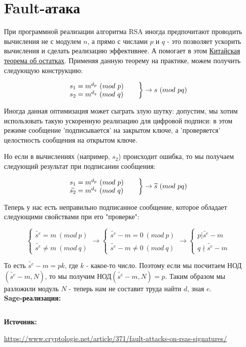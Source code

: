 \documentclass[12pt,a4paper]{scrartcl}
\begin{document}
\section{Fault-атака}

При программной реализации алгоритма RSA иногда предпочитают проводить вычисления не с модулем $n$, а прямо с числами $p$ и  $q$  - это позволяет ускорить вычисления и сделать реализацию эффективнее. А помогает в этом \href{https://yatb.kksctf.ru/}{Китайская теорема об остатках}. Применяя данную теорему на практике, можем получить следующую конструкцию:

$$\left.\parbox{3.5cm}{$s_{1} = m^{d_p}\ (mod\ p) \\ s_{2} = m^{d_q}\ (mod\ q)$}  \right\} \rightarrow s\ (mod\ pq)$$

Иногда данная оптимизация может сыграть злую шутку: допустим, мы хотим использовать такую ускоренную реализацию для цифровой подписи: в этом режиме сообщение 'подписывается' на закрытом ключе, а 'проверяется' целостность сообщения на открытом ключе.

Но если в вычислениях (например, $s_{2}$) происходит ошибка, то мы получаем следующий результат при подписании сообщения:

$$\left.\parbox{3.5cm}{$s_{1} = m^{d_p}\ (mod\ p) \\ \widetilde{s_{2}} = m^{d_q}\ (mod\ q)$}  \right\} \rightarrow \widetilde{s}\ (mod\ pq)$$

Теперь у нас есть неправильно подписанное сообщение, которое обладает следующими свойствами при его "проверке":

$$\begin{cases} \widetilde{s^e} = m\ (mod\ p)\\ \widetilde{s^e} \neq m\ (mod\ q) \end{cases} \rightarrow \begin{cases} \widetilde{s^e} - m = 0\ (mod\ p)\\ \widetilde{s^e} -m \neq 0\ (mod\ q) \end{cases} \rightarrow \begin{cases} p | \widetilde{s^e} - m \\ q \nmid \widetilde{s^e} -m \end{cases} $$

То есть $\widetilde{s^e} - m = pk$, где $k$ - какое-то число. Поэтому если мы посчитаем НОД$(\widetilde{s^e} - m, N)$, то мы получим НОД$(\widetilde{s^e} - m, N)=p$. Таким образом мы разложили модуль $N$ - теперь нам не составит труда найти $d$, зная $e$.\\

\textbf{Sage-реализация:}

\inputminted[tabsize=4,obeytabs,fontsize=\footnotesize]{python3}{./RSA_scripts/fault_attack.sage}

\textbf{Источник:}

\href{https://www.cryptologie.net/article/371/fault-attacks-on-rsas-signatures/}{https://www.cryptologie.net/article/371/fault-attacks-on-rsas-signatures/}
\end{document}
